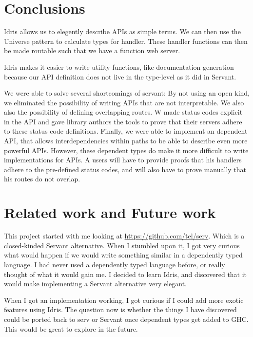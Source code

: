 \documentclass[12pt,a4paper]{article}
\begin{document}
\section{Conclusions}
Idris allows us to elegently describe APIs as simple terms. We can
then use the Universe pattern to calculate types for handler.
These handler functions can then be made routable such that we have
a function web server.

Idris makes it easier to write utility functions, like documentation generation
because our API definition does not live in the type-level as it did in Servant.

We were able to solve several shortcomings of servant: By not using an open kind, 
we eliminated the possibility of writing APIs that are not interpretable.  We also also the possibility
of defining overlapping routes. W made status codes explicit in the API and gave
library authors the tools to prove that their servers adhere to these status code
definitions.  Finally, we were able to implement an dependent API, that allows interdependencies
within paths to be able to describe even more powerful APIs. However, these dependent types do make
it more difficult to write implementations for APIs.  A users will have to provide proofs that his
handlers adhere to the pre-defined status codes, and will also have to prove manually that his
routes do not overlap. 


\section{Related work and Future work}
This project started with me looking at \url{https://github.com/tel/serv}. Which is
a closed-kinded Servant alternative. When I stumbled upon it, I got very curious
what would happen if we would write something similar in a dependently typed language.
I had never used a dependently typed language before, or really thought of what it would gain me.
I decided to learn Idris, and discovered that it would make implementing a Servant alternative
very elegant.

When I got an implementation working, I got curious if I could add more exotic features using Idris.
The question now is whether the things I have discovered could be ported back to serv or Servant 
once dependent types get added to GHC. This would be great to explore in the future.


\end{document}

